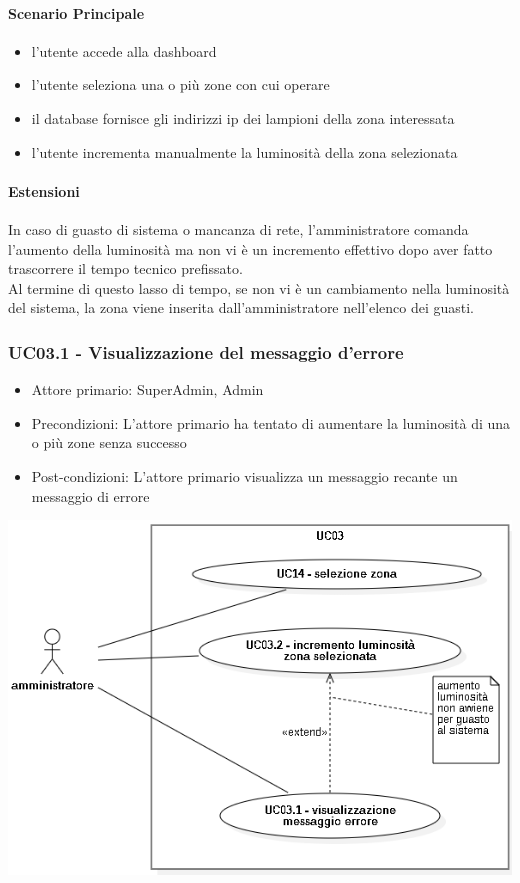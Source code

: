 \documentclass[12pt]{article}
\begin{document}
\paragraph{Scenario Principale}
\begin{itemize}
	\item l'utente accede alla dashboard
	\item l'utente seleziona una o più zone con cui operare
	\item il database fornisce gli indirizzi ip dei lampioni della zona interessata
	\item l'utente incrementa manualmente la luminosità della zona selezionata
\end{itemize}
\paragraph{Estensioni} In caso di guasto di sistema o mancanza di rete, l'amministratore comanda l'aumento della luminosità ma non vi è un incremento effettivo dopo aver fatto trascorrere il tempo tecnico prefissato.\\
Al termine di questo lasso di tempo, se non vi è un cambiamento nella luminosità del sistema, la zona viene inserita dall'amministratore nell'elenco dei guasti. 

\subsubsection{UC03.1 - Visualizzazione del messaggio d'errore}
\begin{itemize}
	\item Attore primario: SuperAdmin, Admin
	\item Precondizioni: L'attore primario ha tentato di aumentare la luminosità di una o più zone senza successo
	\item Post-condizioni: L'attore primario visualizza un messaggio recante un messaggio di errore
\end{itemize}

\includegraphics[scale=0.5]{UC03.png}
\end{document}
